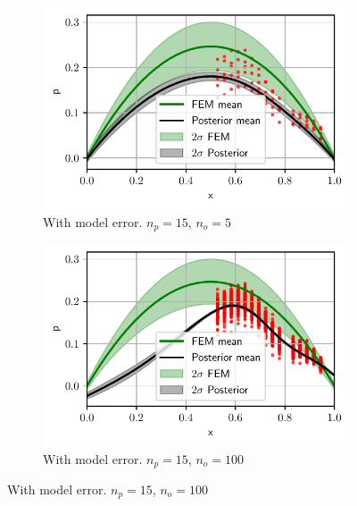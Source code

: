 \documentclass[%
  a4paper,oneside,%
  11pt,%
  smallchapters,
  style=printdev,
  extramargin,
  green,%
  rgb, <cmyk>
  ]{tubsbook}
\begin{document}
\begin{figure}[!ht]

	\begin{subfigure}[t]{.5\textwidth}
	\centering
	\includegraphics[width=1\linewidth]{../../Python/Results/1D/HalfSide/Model_Error/5o_15s/Result.pdf}
	\caption{With model error. $n_p=15$, $n_o=5$}
		\label{fig:1DOneSideda}
	\end{subfigure}%
	\begin{subfigure}[t]{.5\textwidth}
	\centering
	\includegraphics[width=1\linewidth]{../../Python/Results/1D/HalfSide/Model_Error/100o_15s/Result.pdf}
	\centering
	\caption{With model error. ${n_p=15}$, ${n_o=100}$ }
	\label{fig:1DOneSidedb}
	\end{subfigure}
	

\end{figure}
\end{document}
